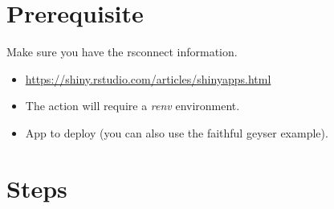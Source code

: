 \documentclass[
]{book}
\providecommand{\tightlist}{%
  \setlength{\itemsep}{0pt}\setlength{\parskip}{0pt}}
\begin{document}
\hypertarget{prerequisite-4}{%
\section{Prerequisite}\label{prerequisite-4}}

Make sure you have the rsconnect information.

\begin{itemize}
\tightlist
\item
  \url{https://shiny.rstudio.com/articles/shinyapps.html}
\item
  The action will require a \emph{renv} environment.
\item
  App to deploy (you can also use the faithful geyser example).
\end{itemize}

\hypertarget{steps-4}{%
\section{Steps}\label{steps-4}}
\end{document}
